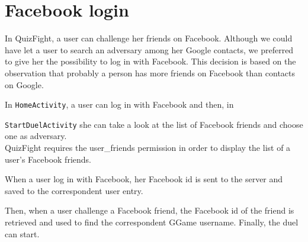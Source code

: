 \section{Facebook login}

In QuizFight, a user can challenge her friends on Facebook.
Although we could have let a user to search an adversary among her Google
contacts, we preferred to give her the possibility to log in with Facebook.
This decision is based on the observation that probably a person has more
friends on Facebook than contacts on Google.

In \texttt{HomeActivity}, a user can log in with Facebook and then, in

\texttt{StartDuelActivity} she can take a look at the list of
Facebook friends and choose one as adversary. \\

QuizFight requires the user\_friends permission in order to display the
list of a user's Facebook friends.

When a user log in with Facebook, her Facebook id is sent to the server and
saved to the correspondent user entry.

Then, when a user challenge a Facebook friend, the Facebook id of the friend
is retrieved and used to find the correspondent GGame username.
Finally, the duel can start.
